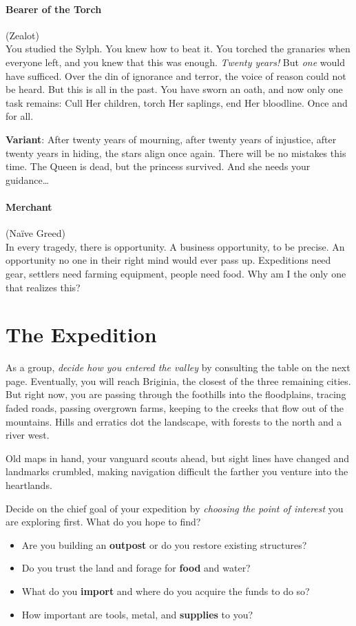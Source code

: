 \paragraph{Bearer of the Torch} (Zealot)\\
You studied the Sylph. You knew how to beat it.
You torched the granaries when everyone left, and you knew that this was
enough. \emph{Twenty years!} But \emph{one} would have sufficed. Over
the din of ignorance and terror, the voice of reason could not be heard.
But this is all in the past. You have sworn an oath, and now only one
task remains: Cull Her children, torch Her saplings, end Her bloodline.
Once and for all.

\textbf{Variant}: After twenty years of mourning, after twenty years of
injustice, after twenty years in hiding, the stars align once again.
There will be no mistakes this time. The Queen is dead, but the princess
survived. And she needs your guidance…

\paragraph{Merchant}
(Naïve Greed)\\
In every tragedy, there is opportunity. A business
opportunity, to be precise. An opportunity no one in their right mind
would ever pass up. Expeditions need gear, settlers need farming
equipment, people need food. Why am I the only one that realizes this?



\section{The Expedition}

As a group, \textit{decide how you entered the valley} by consulting the table on the next page.
Eventually, you will reach Briginia, the closest of the three remaining cities.
But right now, you are passing through the foothills into the floodplains, tracing faded roads, passing overgrown farms, keeping to the creeks that flow out of the mountains.
Hills and erratics dot the landscape, with forests to the north and a river west.

Old maps in hand, your vanguard scouts ahead, but sight lines have changed and landmarks crumbled, making navigation difficult the farther you venture into the heartlands.

Decide on the chief goal of your expedition by \textit{choosing the point of interest} you are exploring first. What do you hope to find?
\begin{itemize}
	\item Are you building an \textbf{outpost} or do you restore existing structures?
	\item Do you trust the land and forage for \textbf{food} and water?
	\item What do you \textbf{import} and where do you acquire the funds to do so?
	\item How important are tools, metal, and \textbf{supplies} to you?
\end{itemize}


